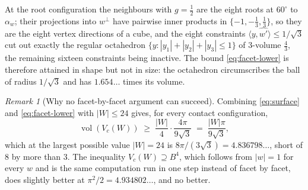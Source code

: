 \documentclass[11pt,reqno]{amsart}
\renewcommand{\_}{\origunderscore\allowbreak}
\numberwithin{equation}{section}
\theoremstyle{plain}
\theoremstyle{definition}
\theoremstyle{remark}
\newtheorem{remark}[thm]{Remark}
\DeclareMathOperator{\vol}{vol}
\begin{document}
At the root configuration the neighbours with $g=\tfrac12$ are the eight
roots at $60^{\circ}$ to $\alpha_w$; their projections into $w^{\perp}$
have pairwise inner products in $\{-1,-\tfrac13,\tfrac13\}$, so they are
the eight vertex directions of a cube, and the eight constraints
$\langle y,\widehat{w'}\rangle\le1/\sqrt3$ cut out exactly the regular
octahedron $\{y:|y_1|+|y_2|+|y_3|\le1\}$ of $3$-volume $\tfrac43$, the
remaining sixteen constraints being inactive. The bound
\eqref{eq:facet-lower} is therefore attained in shape but not in size:
the octahedron circumscribes the ball of radius $1/\sqrt3$ and has
$1.654\ldots$ times its volume.

\begin{remark}[Why no facet-by-facet argument can succeed]\label{rem:facet-local-obstruction}
Combining \eqref{eq:surface} and \eqref{eq:facet-lower} with
$|W|\le24$ gives, for every contact configuration,
\[
  \vol(V_c(W))\;\ge\;\frac{|W|}{4}\cdot\frac{4\pi}{9\sqrt3}
  \;=\;\frac{|W|\pi}{9\sqrt3},
\]
which at the largest possible value $|W|=24$ is
$8\pi/(3\sqrt3)=4.836798\ldots$, short of $8$ by more than $3$. The
inequality $V_c(W)\supseteq B^4$, which follows from $|w|=1$ for every
$w$ and is the same computation run in one step instead of facet by facet, does slightly better at $\pi^2/2=4.934802\ldots$, and no better.


\end{remark}
\end{document}
